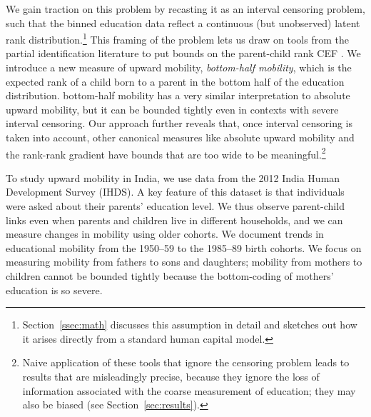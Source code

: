 \documentclass[12pt,letterpaper]{article}
\numberwithin{equation}{section}
\begin{document}
We gain traction on this problem by recasting it as an interval censoring problem, such that the binned education data reflect a continuous (but unobserved) latent rank distribution.\footnote{Section~\ref{ssec:math} discusses this assumption in detail and sketches out how it arises directly from a standard human capital model.} This framing of the problem lets us draw on tools from the partial identification literature to put bounds on the parent-child rank CEF \cite{manski2002,nra2020mort}. We introduce a new measure of upward mobility, \textit{bottom-half mobility}, which is the expected rank of a child born to a parent in the bottom half of the education distribution. bottom-half mobility has a very similar interpretation to absolute upward mobility, but it can be bounded tightly even in contexts with severe interval censoring. Our approach further reveals that, once interval censoring is taken into account, other canonical measures like absolute upward mobility and the rank-rank gradient have bounds that are too wide to be meaningful.\footnote{Naive application of these tools that ignore the censoring problem leads to results that are misleadingly precise, because they ignore the loss of information associated with the coarse measurement of education; they may also be biased (see Section~\ref{sec:results}).}

To study upward mobility in India, we use data from the 2012 India Human Development Survey (IHDS). A key feature of this dataset is that individuals were asked about their parents' education level. We thus observe parent-child links even when parents and children live in different households, and we can measure changes in mobility using older cohorts. We document trends in educational mobility from the 1950--59 to the 1985--89 birth cohorts. We focus on measuring mobility from fathers to sons and daughters; mobility from mothers to children cannot be bounded tightly because the bottom-coding of mothers' education is so severe.
\end{document}
